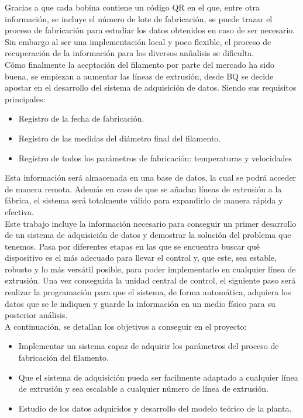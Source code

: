 Gracias a que cada bobina contiene un código QR en el que, entre otra información, se incluye el número de lote de fabricación, se puede trazar el proceso de fabricación para estudiar los datos obtenidos en caso de ser necesario. Sin embargo al ser una implementación local y poco flexible, el proceso de recuperación de la información para los diversos anñalisis se dificulta.\\

Cómo finalmente la aceptación del filamento por parte del mercado ha sido buena, se empiezan a aumentar las líneas de extrusión, desde BQ se decide apostar en el desarrollo del sistema de adquisición de datos. Siendo sus requisitos principales:

\begin{itemize}
    \item{Registro de la fecha de fabricación.}
    \item{Registro de las medidas del diámetro final del filamento.}
    \item{Registro de todos los parámetros de fabricación: temperaturas y velocidades}
\end{itemize}

Esta información será almacenada en una base de datos, la cual se podrá acceder de manera remota. Además en caso de que se añadan líneas de extrusión a la fábrica, el sistema será totalmente válido para expandirlo de manera rápida y efectiva.\\

Este trabajo incluye la información necesario para conseguir un primer desarrollo de un sistema de adquisición de datos y demostrar la solución del problema que tenemos. Pasa por diferentes etapas en las que se encuentra buscar qué dispositivo es el más adecuado para llevar el control y, que este, sea estable, robusto y lo más versátil posible, para poder implementarlo en cualquier línea de extrusión. Una vez conseguida la unidad central de control, el siguiente paso será realizar la programación para que el sistema, de forma automática, adquiera los datos que se le indiquen y guarde la información en un medio físico para su posterior análisis.\\

A continuación, se detallan los objetivos a conseguir en el proyecto:

\begin{itemize}
    \item Implementar un sistema capaz de adquirir los parámetros del proceso de fabricación del filamento.
    \item Que el sistema de adquisición pueda ser facilmente adaptado a cualquier línea de extrusión y sea escalable a cualquier número de línea de extrusión.
    \item Estudio de los datos adquiridos y desarrollo del modelo teórico de la planta.
\end{itemize}
\label{Listado_objetivos}

